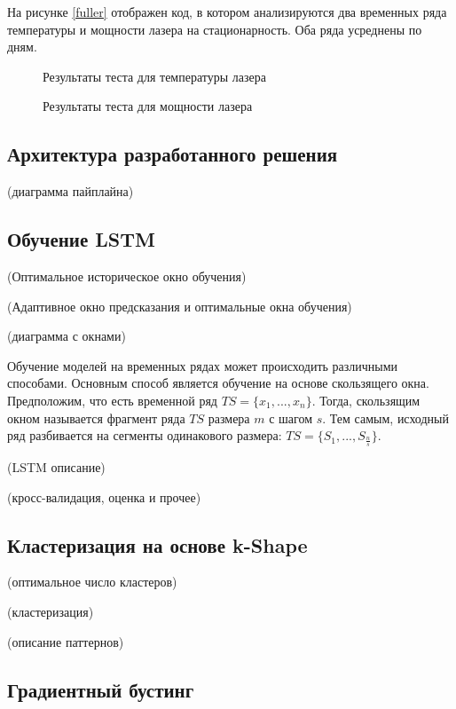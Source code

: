 На рисунке \ref{fuller} отображен код,
в котором анализируются два временных ряда температуры и мощности лазера на стационарность.
Оба ряда усреднены по дням.

\begin{figure}[H]
    \caption{Результаты теста для температуры лазера}
    \label{fullertemp}
\end{figure}

\begin{figure}[H]
    \caption{Результаты теста для мощности лазера}
    \label{fullerpower}
\end{figure}

\subsection{Архитектура разработанного решения}

(диаграмма пайплайна)


\subsection{Обучение LSTM}

(Оптимальное историческое окно обучения)

(Адаптивное окно предсказания и оптимальные окна обучения)

(диаграмма с окнами)

Обучение моделей на временных рядах может происходить различными способами.
Основным способ является обучение на основе скользящего окна.
Предположим, что есть временной ряд $TS = \{x_1, ..., x_n\}$.
Тогда, скользящим окном называется фрагмент ряда $TS$ размера $m$ с шагом $s$.
Тем самым, исходный ряд разбивается на сегменты одинакового размера: $TS = \{S_1, ..., S_{\frac{n}{s}}\}$.

(LSTM описание)

(кросс-валидация, оценка и прочее)

\subsection{Кластеризация на основе k-Shape}

(оптимальное число кластеров)

(кластеризация)

(описание паттернов)

\subsection{Градиентный бустинг}

